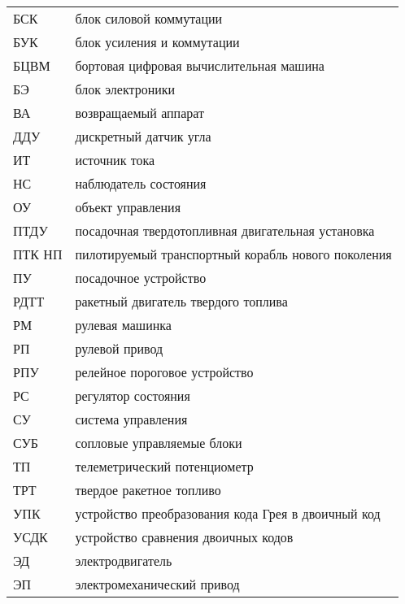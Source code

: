 
\begin{tabular}{ l l  }
	БСК & блок силовой коммутации \\
	БУК	&	блок усиления и коммутации\\
	БЦВМ &	бортовая цифровая вычислительная машина\\
	БЭ &		блок электроники\\
	ВА &		возвращаемый аппарат\\
	ДДУ &		дискретный датчик угла\\
	ИТ	&	источник тока\\
	НС	&	наблюдатель состояния\\
	ОУ	&	объект управления\\
	ПТДУ &	посадочная твердотопливная двигательная установка\\
	ПТК НП &	пилотируемый транспортный корабль нового поколения \\
	ПУ	&	посадочное устройство\\
	РДТТ	&	ракетный двигатель твердого топлива\\
	РМ	&	рулевая машинка\\
	РП	&	рулевой привод\\
	РПУ	&	релейное пороговое устройство\\
	РС	&	регулятор состояния\\
	СУ	&	система управления\\
	СУБ	&	сопловые управляемые блоки\\
	ТП	&	телеметрический потенциометр\\
	ТРТ	&	твердое ракетное топливо\\
	УПК	&	устройство преобразования кода Грея в двоичный код\\
	УСДК &	устройство сравнения двоичных кодов\\
	ЭД	&	электродвигатель\\
	ЭП	&	электромеханический привод\\
	
\end{tabular}

\clearpage